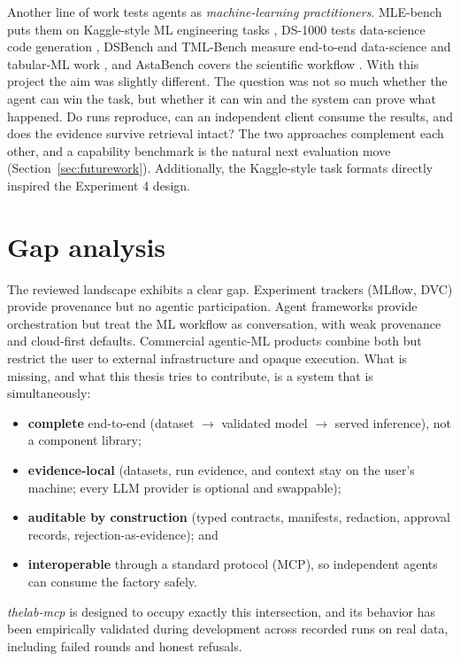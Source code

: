 Another line of work tests agents as \emph{machine-learning practitioners}. MLE-bench puts them on Kaggle-style ML engineering tasks \cite{chan2024mlebench}, DS-1000
tests data-science code generation \cite{lai2023ds1000}, DSBench and TML-Bench measure end-to-end data-science and tabular-ML work \cite{jing2024dsbench,zhao2026tmlbench}, and AstaBench covers the scientific workflow \cite{matthews2025astabench}. With this project the aim was slightly different. The question was not so much whether the agent can win the task, but whether it can win and the system can prove what happened. Do runs reproduce, can an independent client consume the results, and does the evidence survive retrieval intact? The two approaches complement each other, and a capability benchmark is the natural next evaluation move (Section~\ref{sec:futurework}). Additionally, the Kaggle-style task formats directly inspired the Experiment 4 design.

\section{Gap analysis}
\label{sec:bg-gap}

The reviewed landscape exhibits a clear gap. Experiment trackers (MLflow, DVC) provide provenance but no agentic participation. Agent frameworks provide orchestration but treat the ML workflow as conversation, with weak provenance and cloud-first defaults. Commercial agentic-ML products combine both but restrict the user to external infrastructure and opaque execution. What is missing, and what this thesis tries to contribute, is a system that is simultaneously:

\begin{itemize}
	\item \textbf{complete} end-to-end (dataset $\rightarrow$ validated model $\rightarrow$ served inference), not a component library;
	\item \textbf{evidence-local} (datasets, run evidence, and context stay on the user's machine; every LLM provider is optional and swappable);
	\item \textbf{auditable by construction} (typed contracts, manifests, redaction, approval records, rejection-as-evidence); and
	\item \textbf{interoperable} through a standard protocol (MCP), so independent agents can consume the factory safely.
\end{itemize}

\emph{thelab-mcp} is designed to occupy exactly this intersection, and its behavior has been empirically validated during development across recorded runs on real data, including failed rounds and honest refusals.
